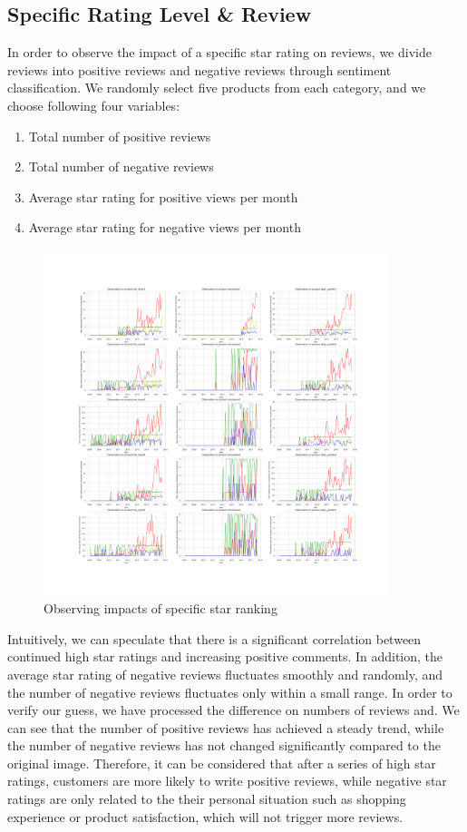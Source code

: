 \documentclass[12pt]{article}  %
\begin{document}
\subsection{Specific Rating Level \& Review}
In order to observe the impact of a specific star rating on reviews, we divide reviews into positive reviews and negative reviews through sentiment classification. We randomly select five products from each category, and we choose following four variables:
\begin{enumerate}[\bfseries 1.]
    \item Total number of positive reviews
    \item Total number of negative reviews
    \item Average star rating for positive views per month
    \item  Average star rating for negative views per month
\end{enumerate}
\begin{figure}[!htbp]
\centering
\includegraphics[width=0.9\textwidth]{2_D.png}
\caption{Observing impacts of specific star ranking }\label{Observing impacts of specic star ranking}
\end{figure}


Intuitively, we can speculate that there is a significant correlation between continued high star ratings and increasing positive comments. In addition, the average star rating of negative reviews fluctuates smoothly and randomly, and the number of negative reviews fluctuates only within a small range.
In order to verify our guess, we have processed the difference on numbers of reviews and. We can see that the number of positive reviews has achieved a steady trend, while the number of negative reviews has not changed significantly compared to the original image. Therefore, it can be considered that after a series of high star ratings, customers are more likely to write positive reviews, while negative star ratings are only related to the their personal situation such as shopping experience or product satisfaction, which will not trigger more reviews.
\end{document}
